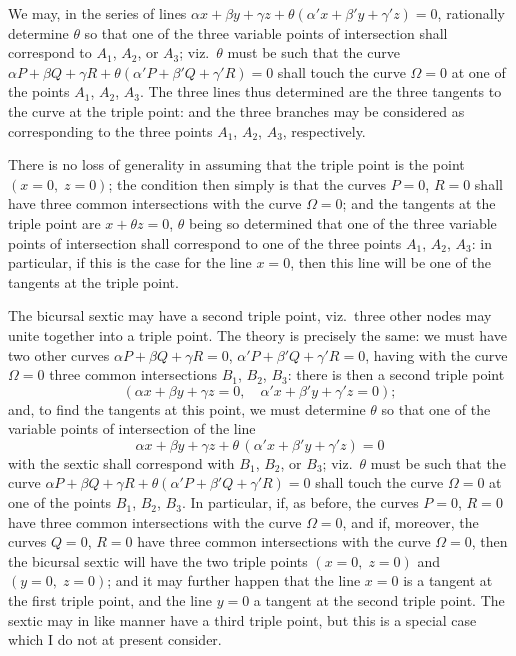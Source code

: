 \documentclass[12pt,a4paper]{article}
\begin{document}
We may, in the series of lines $\alpha x+\beta y+\gamma z + \theta(\alpha' x+\beta' y+\gamma' z)=0$, rationally determine $\theta$ so that one of the three variable points of intersection shall correspond to $A_1$, $A_2$, or $A_3$; viz.\ $\theta$ must be such that the curve $\alpha P+\beta Q+\gamma R+\theta(\alpha' P+\beta' Q+\gamma' R)=0$ shall touch the curve $\Omega=0$ at one of the points $A_1$, $A_2$, $A_3$. The three lines thus determined are the three tangents to the curve at the triple point: and the three branches may be considered as corresponding to the three points $A_1$, $A_2$, $A_3$, respectively.

There is no loss of generality in assuming that the triple point is the point $(x=0,\; z=0)$; the condition then simply is that the curves $P=0$, $R=0$ shall have three common intersections with the curve $\Omega=0$; and the tangents at the triple point are $x+\theta z=0$, $\theta$ being so determined that one of the three variable points of intersection shall correspond to one of the three points $A_1$, $A_2$, $A_3$: in particular, if this is the case for the line $x=0$, then this line will be one of the tangents at the triple point.

\newpage

\noindent
The bicursal sextic may have a second triple point, viz.\ three other nodes may unite together into a triple point. The theory is precisely the same: we must have two other curves $\alpha P+\beta Q+\gamma R=0$, $\alpha' P+\beta' Q+\gamma' R=0$, having with the curve $\Omega=0$ three common intersections $B_1$, $B_2$, $B_3$: there is then a second triple point
\[
(\alpha x + \beta y + \gamma z = 0,\quad \alpha' x + \beta' y + \gamma' z = 0);
\]
and, to find the tangents at this point, we must determine $\theta$ so that one of the variable points of intersection of the line
\[
\alpha x + \beta y + \gamma z + \theta\, (\alpha' x + \beta' y + \gamma' z) = 0
\]
with the sextic shall correspond with $B_1$, $B_2$, or $B_3$; viz.\ $\theta$ must be such that the curve $\alpha P+\beta Q+\gamma R+\theta(\alpha' P+\beta' Q+\gamma' R)=0$ shall touch the curve $\Omega=0$ at one of the points $B_1$, $B_2$, $B_3$. In particular, if, as before, the curves $P=0$, $R=0$ have three common intersections with the curve $\Omega=0$, and if, moreover, the curves $Q=0$, $R=0$ have three common intersections with the curve $\Omega=0$, then the bicursal sextic will have the two triple points $(x=0,\; z=0)$ and $(y=0,\; z=0)$; and it may further happen that the line $x=0$ is a tangent at the first triple point, and the line $y=0$ a tangent at the second triple point. The sextic may in like manner have a third triple point, but this is a special case which I do not at present consider.
\end{document}
